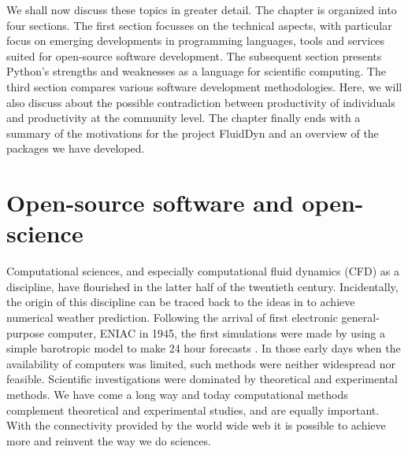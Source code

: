 We shall now discuss these topics in greater detail. The chapter is organized
into four sections. The first section focusses on the technical aspects, with
particular focus on emerging developments in programming languages, tools and
services suited for open-source software development. The subsequent section
presents Python's strengths and weaknesses as a language for scientific
computing.
%
The third section compares various software development methodologies. Here, we
will also discuss about the possible contradiction between productivity of
individuals and productivity at the community level.
%
The chapter finally ends with a summary of the motivations for the project
FluidDyn and an overview of the packages we have developed.
%

\section{Open-source software and open-science}

Computational sciences, and especially computational fluid dynamics (CFD) as a
discipline, have flourished in the latter half of the twentieth century.
Incidentally, the origin of this discipline can be traced back to the ideas in
\citet{richardson_weather_1922} to achieve numerical weather prediction.
Following the arrival of first electronic general-purpose computer, ENIAC in
1945, the first simulations were made by \citet{charney_numerical_1950} using a
simple barotropic model to make 24 hour forecasts \citep[see
also][]{lynch_richardson_2010}. In those early days when the availability of
computers was limited, such methods were neither widespread nor feasible.
Scientific investigations were dominated by theoretical and experimental
methods.
%
We have come a long way and today computational methods complement theoretical
and experimental studies, and are equally important.
%
%
With the connectivity provided by the world wide web it is possible to achieve
more and reinvent the way we do sciences.

